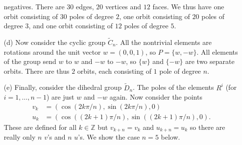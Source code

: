 \documentclass{amsart}
\newcommand{\Z}         {{\mathbb{Z}}}
\newcommand{\tC}        {\widetilde{C}}
\newcommand{\tD}        {\widetilde{D}}
\newcommand{\blob}      {circle(0.03cm)}
\renewcommand{\:}{\colon}
\theoremstyle{definition}
\begin{document}
\begin{itemize}
  negatives.  There are $30$ edges, $20$ vertices and $12$ faces.  We
  thus have one orbit consisting of $30$ poles of degree $2$, one
  orbit consisting of $20$ poles of degree $3$, and one orbit
  consisting of $12$ poles of degree $5$.
 \item[(d)] Now consider the cyclic group $\tC_n$.  All the nontrivial
  elements are rotations around the unit vector $w=(0,0,1)$, so
  $P=\{w,-w\}$.  All elements of the group send $w$ to $w$ and $-w$ to
  $-w$, so $\{w\}$ and $\{-w\}$ are two separate orbits.  There are
  thus $2$ orbits, each consisting of $1$ pole of degree $n$.
 \item[(e)] Finally, consider the dihedral group $\tD_n$.  The poles
  of the elements $R^i$ (for $i=1,\ldots,n-1$) are just $w$ and $-w$
  again.  Now consider the points
  \begin{align*}
   v_k &= (\cos(2k\pi/n),\sin(2k\pi/n),0) \\
   u_k &= (\cos((2k+1)\pi/n),\sin((2k+1)\pi/n),0).
  \end{align*}
  These are defined for all $k\in\Z$ but $v_{k+n}=v_k$ and
  $u_{k+n}=u_k$ so there are really only $n$ $v$'s and $n$ $u$'s.
  We show the case $n=5$ below.
  \begin{center}
\end{center}
\end{itemize}
\end{document}
